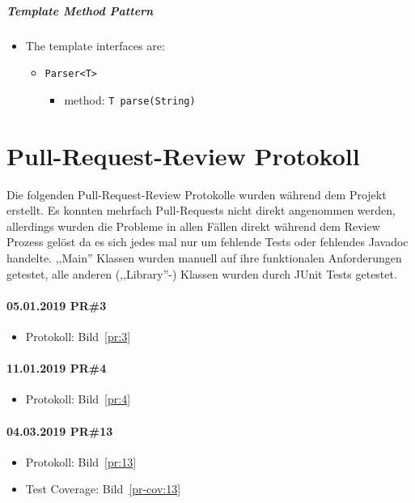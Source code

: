\documentclass[accentcolor=tud0b,12pt,paper=a4]{tudreport}
\begin{document}
\subparagraph{Template Method Pattern}
\begin{itemize}
\item The template interfaces are:
	\begin{itemize}
	\item \texttt{Parser<T>}
	\begin{itemize}
	\item method: \texttt{T parse(String)}
	\end{itemize}
	\end{itemize}
\end{itemize}

\newpage
\section{Pull-Request-Review Protokoll}
Die folgenden Pull-Request-Review Protokolle wurden während dem Projekt erstellt. Es konnten mehrfach Pull-Requests nicht direkt angenommen werden, allerdings wurden die Probleme in allen Fällen direkt während dem Review Prozess gelöst da es sich jedes mal nur um fehlende Tests oder fehlendes Javadoc handelte. ,,Main'' Klassen wurden manuell auf ihre funktionalen Anforderungen getestet, alle anderen (,,Library''-) Klassen wurden durch JUnit Tests getestet.

\paragraph{05.01.2019 PR\#3}
\begin{itemize}
\item Protokoll: Bild~\ref{pr:3}
\end{itemize}

\paragraph{11.01.2019 PR\#4}
\begin{itemize}
\item Protokoll: Bild~\ref{pr:4}
\end{itemize}

\paragraph{04.03.2019 PR\#13}
\begin{itemize}
\item Protokoll: Bild~\ref{pr:13}
\item Test Coverage: Bild~\ref{pr-cov:13}
\end{itemize}
\end{document}
